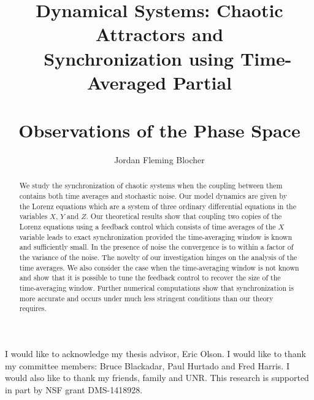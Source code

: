 \documentclass[master,tocprelim,12pt]{unrthesis}
\title{Dynamical Systems: Chaotic Attractors and \\{~}
    Synchronization using Time-Averaged Partial \\{~}\\
\vskip-12pt
Observations of the Phase Space}
\author{
Jordan Fleming Blocher 
}
\theoremstyle{definition}
\numberwithin{equation}{chapter}
\begin{document}
\maketitle



\begin{abstract}

We study the synchronization of chaotic systems when the coupling
between them contains both time averages and stochastic noise.
Our model dynamics are given by the Lorenz equations
which are a system of three ordinary differential
equations in the variables $X$, $Y$ and $Z$.
Our theoretical results show that coupling two copies of the
Lorenz equations using a feedback control which consists
of time averages of the $X$ variable
leads to exact synchronization provided the
time-averaging window is known and sufficiently small.
In the presence of noise the convergence is to within a
factor of the variance of the noise.
The novelty of our investigation hinges on the
analysis of the time averages.
We also consider the case when the time-averaging window
is not known and show that it is possible to tune the
feedback control to recover the size of the
time-averaging window.
Further numerical computations
show that synchronization is more accurate and occurs
under much less stringent conditions than our theory requires.

\end{abstract}

\begin{acknowledgements}
I would like to acknowledge my thesis advisor, Eric Olson.
I would like to thank my committee members:
Bruce Blackadar, Paul Hurtado and Fred Harris.
I would also like to thank my friends, family and UNR.
This research is supported in part by NSF grant DMS-1418928.
\end{acknowledgements}

\contentspage
\tablelistpage
\figurelistpage
\end{document}
